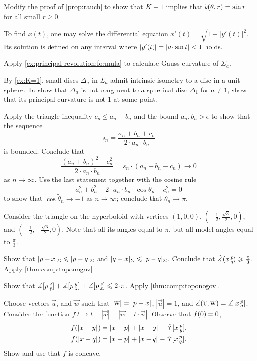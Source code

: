 \begin{multicols}{2}
 Modify the proof of \ref{prop:rauch} to show that $K\equiv 1$ implies that $b(\theta,r)\z=\sin r$ for all small $r\ge 0$.



To find $x(t)$, one may solve the differential equation
$x'(t)=\sqrt{1-|y'(t)|^2}$.
Its solution is defined on any interval where $|y'(t)|\z=|a\cdot \sin t|<1$ holds.

Apply \ref{ex:principal-revolution:formula} to calculate Gauss curvature of $\Sigma_a$.

By \ref{ex:K=1}, small discs $\Delta_a$ in $\Sigma_a$ admit intrinsic isometry to a disc in a unit sphere.
To show that $\Delta_a$ is not congruent to a spherical disc $\Delta_1$ for $a\ne 1$, show that its principal curvature is not 1 at some point. 


\setcounter{eqtn}{0}

Apply the triangle inequality $c_n\le a_n+b_n$ and the bound $a_n,b_n>\epsilon$ to show that the sequence 
\[s_n=\frac{a_n+b_n+c_n}{2\cdot a_n\cdot b_n}\]
is bounded.
Conclude that 
\[\frac{(a_n+b_n)^2-c_n^2}{2\cdot a_n\cdot b_n}=s_n\cdot (a_n+b_n-c_n)\to 0\]
as $n\to\infty$.
Use the last statement together with the cosine rule
\[a_n^2+b_n^2-2\cdot a_n\cdot b_n\cdot\cos\tilde\theta_n -c_n^2=0\]
to show that $\cos\tilde\theta_n\to -1$ as $n\to\infty$;
conclude that $\theta_n\to \pi$.

Consider the triangle on the hyperboloid with vertices $(1,0,0)$, $(-\tfrac{1}2, \tfrac{\sqrt{3} }2, 0)$, and $(-\tfrac{1}2, -\tfrac{\sqrt{3} }2, 0)$.
Note that all its angles equal to $\pi$, but all model angles equal to $\tfrac{\pi}3$.

Show that $\dist{p}{x}\Sigma\le \dist{p}{q}\Sigma$ and $\dist{q}{x}\Sigma\le \dist{p}{q}\Sigma$.
Conclude that $\tilde\measuredangle(x\,{}^{p}_{q}\hspace{-0.2ex})\geqslant \tfrac\pi3$.
Apply \ref{thm:comp:toponogov}.

Show that 
$\measuredangle\hinge pxy+\measuredangle\hinge pyz+\measuredangle\hinge pzx\le2\cdot \pi$.
Apply \ref{thm:comp:toponogov}.

Choose vectors $\vec u$, and $\vec w$ 
such that $|\vec w|\z=\dist{p}{x}{}$, $|\vec u|=1$, and $\measuredangle(\text{\sc{u}},\text{\sc{w}})=\measuredangle[x\,{}^{p}_{q}]$.
Consider the function
$f\:t\mapsto t+|\vec w|-|\vec w-t\cdot \vec u|$.
Observe that $f(0)\z=0$,
\begin{align*}
f(\dist{x}{y}{})&=\dist{x}{p}{}+\dist{x}{y}{}-\side\hinge xpy,
\\
f(\dist{x}{q}{})&=\dist{x}{p}{}+\dist{x}{q}{}-\side\hinge xpq.
\end{align*}
Show and use that $f$ is concave.


\end{multicols}
